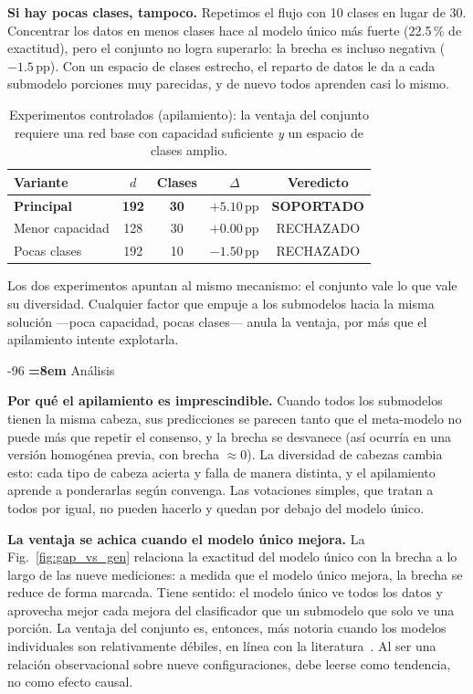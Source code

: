 \documentclass[runningheads]{llncs}
\makeatletter
\renewcommand\section{\@startsection{section}{1}{\z@}%
   {-9\p@ \@plus -2\p@ \@minus -2\p@}{6\p@ \@plus 2\p@ \@minus 2\p@}%
   {\normalfont\large\bfseries\boldmath\rightskip=\z@ \@plus 8em\pretolerance=10000 }}
\makeatother
\begin{document}
\textbf{Si hay pocas clases, tampoco.} Repetimos el flujo con 10 clases en
lugar de 30.
Concentrar los datos en menos clases hace al modelo único más fuerte
(22.5\,\% de exactitud), pero el conjunto no logra
superarlo: la brecha es incluso negativa ($-1.5$\,pp). Con un espacio de clases estrecho, el reparto
de datos le da a cada submodelo porciones muy parecidas, y de nuevo todos
aprenden casi lo mismo.

\begin{table}[h]
\centering
\caption{Experimentos controlados (apilamiento): la ventaja del conjunto
requiere una red base con capacidad suficiente \emph{y} un espacio de clases
amplio.}
\label{tab:ablations}
\begin{tabular}{lcccc}
\toprule
\textbf{Variante} & $d$ & Clases & $\Delta$ & \textbf{Veredicto} \\
\midrule
\textbf{Principal} & \textbf{192} & \textbf{30} & $\mathbf{+5.10}$\,pp & \textbf{SOPORTADO} \\
Menor capacidad    & 128 & 30 & $+0.00$\,pp & RECHAZADO \\
Pocas clases       & 192 & 10 & $-1.50$\,pp & RECHAZADO \\
\bottomrule
\end{tabular}
\end{table}

Los dos experimentos apuntan al mismo mecanismo: el conjunto vale lo que vale
su diversidad. Cualquier factor que empuje a los submodelos hacia la misma
solución ---poca capacidad, pocas clases--- anula la ventaja, por más que el
apilamiento intente explotarla.

\section{Análisis}

\textbf{Por qué el apilamiento es imprescindible.} Cuando todos los submodelos
tienen la misma cabeza, sus predicciones se parecen tanto que el meta-modelo no
puede más que repetir el consenso, y la brecha se desvanece (así ocurría en una
versión homogénea previa, con brecha $\approx 0$). La diversidad de cabezas
cambia esto: cada tipo de cabeza acierta y falla de manera distinta, y el
apilamiento aprende a ponderarlas según convenga. Las votaciones simples, que
tratan a todos por igual, no pueden hacerlo y quedan por debajo del modelo
único.

\textbf{La ventaja se achica cuando el modelo único mejora.} La
Fig.~\ref{fig:gap_vs_gen} relaciona la exactitud del modelo único con la brecha
a lo largo de las nueve mediciones: a medida que el modelo único mejora, la
brecha se reduce de forma marcada. Tiene sentido: el modelo único ve todos los
datos y aprovecha mejor cada mejora del clasificador que un submodelo que solo
ve una porción. La ventaja del conjunto es, entonces, más notoria cuando los
modelos individuales son relativamente débiles, en línea con la
literatura~\cite{lakshminarayanan2017simple}. Al ser una relación observacional
sobre nueve configuraciones, debe leerse como tendencia, no como efecto causal.
\end{document}
